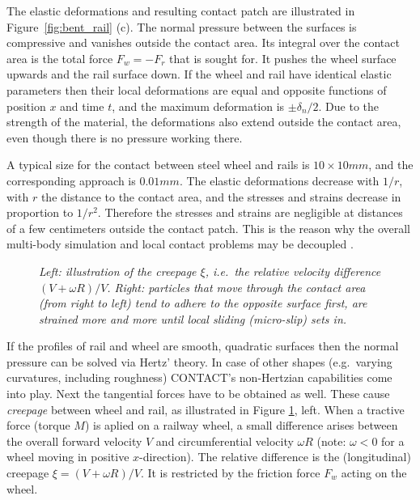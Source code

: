 \documentclass[12pt]{report}
\begin{document}
The elastic deformations and resulting contact patch are illustrated in
Figure~\ref{fig:bent_rail} (c). The normal pressure between the surfaces is
compressive and vanishes outside the contact area. Its integral over the
contact area is the total force $F_w=-F_r$ that is sought for. It pushes
the wheel surface upwards and the rail surface down. If the wheel and rail
have identical elastic parameters then their local deformations are equal
and opposite functions of position $x$ and time $t$, and the maximum
deformation is $\pm\delta_n/2$. Due to the strength of the material, the
deformations also extend outside the contact area, even though there is no
pressure working there.

A typical size for the contact between steel wheel and rails is $10\times
10\unit{mm}$, and the corresponding approach is $0.01\unit{mm}$. The elastic
deformations decrease with $1/r$, with $r$ the distance to the contact area,
and the stresses and strains decrease in proportion to $1/r^2$. Therefore
the stresses and strains are negligible at distances of a few centimeters
outside the contact patch. This is the reason why the overall multi-body
simulation and local contact problems may be decoupled \cite{Kalker1990}.

\begin{figure}[bt]
\centering
{}
\hspace{5mm}
\caption{\em Left: illustration of the creepage $\xi$, i.e.\ the relative
velocity difference $(V+\omega R)/V$. Right: particles that move through the contact area (from right
to left) tend to adhere to the opposite surface first, are strained more
and more until local sliding (micro-slip) sets in.}
\label{fig:bent_tang}
\end{figure}

If the profiles of rail and wheel are smooth, quadratic surfaces then the
normal pressure can be solved via Hertz' theory. In case of other shapes
(e.g.\ varying curvatures, including roughness) CONTACT's non-Hertzian
capabilities come into play. Next the tangential forces have to be obtained
as well. These cause {\em creepage\/} between wheel and rail, as
illustrated in Figure \ref{fig:bent_tang}, left. When a tractive force
(torque $M$) is aplied on a railway wheel, a small difference arises
between the overall forward velocity $V$ and circumferential velocity
$\omega R$ (note: $\omega<0$ for a wheel moving in positive $x$-direction).
The relative difference is the (longitudinal) creepage $\xi=(V+\omega R)/V$.
It is restricted by the friction force $F_w$ acting on the wheel.
\end{document}
